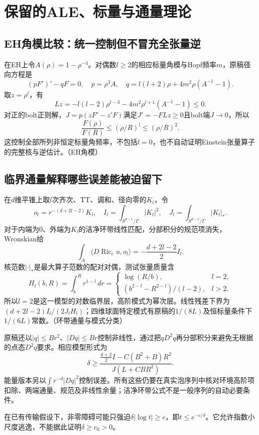 \documentclass[UTF8,fontset=fandol,zihao=-4]{ctexart}
\theoremstyle{research}
\DeclareMathOperator{\Ric}{Ric}
\numberwithin{equation}{section}
\begin{document}
\section{保留的ALE、标量与通量理论}
\subsection{EH角模比较：统一控制但不冒充全张量逆}
在EH上令$A(\rho)=1-\rho^{-4}$。对偶数$l\ge2$的相应标量角模与Hopf频率$m$，原稿径向方程是
\[
(pF')'-qF=0,\quad p=\rho^3A,\quad
q=l(l+2)\rho+4m^2\rho(A^{-1}-1).
\]
取$z=\rho^l$，有
\[
Lz=-l(l-2)\rho^{l-3}-4m^2\rho^{l+1}(A^{-1}-1)\le0.
\]
对正的bolt正则解，$J=p(zF'-z'F)$满足$J'=-F Lz\ge0$且bolt端$J\to0$，所以
\[
\frac{F(\rho)}{F(R)}\le(\rho/R)^l\le(\rho/R)^2.
\]
这控制全部所列非恒定标量角频率，不包括$l=0$，也不自动证明Einstein张量算子的完整核与逆估计。\cite{C}（EH角模）

\subsection{临界通量解释哪些误差能被迫留下}
在$d$维平锥上取$l$次齐次、TT、调和、径向零的$K_l$，令
\[
o_l=r^{-(d+2l-2)}K_l,
\quad I_l=\int_{S^{d-1}/\Gamma}|K_l|^2,
\quad J_l=\int_{S^{d-1}/\Gamma}|K_l|_*.
\]
对于内端为0、外端为$K_l$的洁净环带线性匹配，分部积分的规范项消失，Wronskian给
\[
\int_A\langle D\Ric_eu,o_l\rangle
=-\frac{d+2l-2}{2}I_l.
\]
核范数$|\cdot|_*$是最大算子范数的配对对偶，测试张量质量含
\[
H_l(b,R)=\int_b^Rr^{1-l}\,dr
=\begin{cases}\log(R/b),&l=2,\\
(b^{2-l}-R^{2-l})/(l-2),&l>2.
\end{cases}
\]
所以$l=2$是这一模型的对数临界层，高阶模式为幂次层。线性残差下界为$(d+2l-2)I_l/(2J_lH_l)$；四维球面特定模式有原稿的$1/(8L)$及恒标量条件下$1/(6L)$常数。\cite{C}（环带通量与模式分类）

原稿还以$|q|\le Br^2$、$|Dq|\le Br$控制非线性，通过把$qD^2q$再分部积分来避免无根据的点态$D^2q$要求。相应模型形式为
\[
\delta\ge
\frac{\frac{d+2}{2}I-C(B^2+B)R^2}{J(L+CBR^2)}.
\]
能量版本另以$\int r^{-d}|Dq|^2$控制误差。所有这些仍要在真实泡序列中核对环境高阶项扣除、两端通量、规范及非线性余量；洁净环带公式不是一般序列的自动必要条件。

在已有传输假设下，非零障碍可能只强迫$\delta|\log t|\ge c$，即$t\le e^{-c/\delta}$。它允许指数小尺度逃逸，不能据此证明$\delta\ge c_0>0$。\cite{C}\cite{OzuchH,OzuchI}
\end{document}
